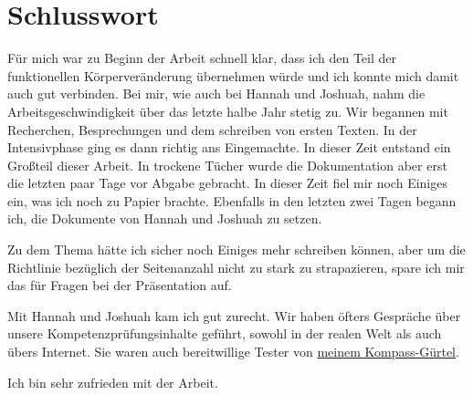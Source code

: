 \section{Schlusswort}
Für mich war zu Beginn der Arbeit schnell klar, dass ich den Teil der funktionellen Körperveränderung
übernehmen würde und ich konnte mich damit auch gut verbinden. Bei mir, wie auch bei Hannah und
Joshuah, nahm die Arbeitsgeschwindigkeit über das letzte halbe Jahr stetig zu. Wir begannen mit
Recherchen, Besprechungen und dem schreiben von ersten Texten. In der Intensivphase ging es dann
richtig ans Eingemachte. In dieser Zeit entstand ein Großteil dieser Arbeit. In trockene Tücher wurde
die Dokumentation aber erst die letzten paar Tage vor Abgabe gebracht. In dieser Zeit fiel mir noch
Einiges ein, was ich noch zu Papier brachte. Ebenfalls in den letzten zwei Tagen begann ich,
die Dokumente von Hannah und Joshuah zu setzen.

Zu dem Thema hätte ich sicher noch Einiges mehr schreiben können, aber um die Richtlinie bezüglich
der Seitenanzahl nicht zu stark zu strapazieren, spare ich mir das für Fragen bei der Präsentation
auf.

Mit Hannah und Joshuah kam ich gut zurecht. Wir haben öfters Gespräche über unsere
Kompetenzprüfungsinhalte geführt, sowohl in der realen Welt als auch übers Internet. Sie waren auch
bereitwillige Tester von \hyperref[sec:Robin:experiments:myCompassBelt]{meinem Kompass-Gürtel}.

Ich bin sehr zufrieden mit der Arbeit.
